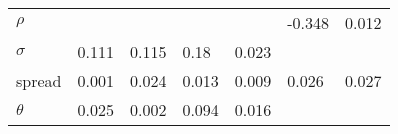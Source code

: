 \begin{table}[H]
\begin{adjustbox}{width=\textwidth}
\begin{tabular}{lllllll}
			$\rho$    &                     &                     &                     &                     &              -0.348 &               0.012 \\
			$\sigma$  &               0.111 &               0.115 &                0.18 &               0.023 &                     &                     \\
			spread &               0.001 &               0.024 &               0.013 &               0.009 &               0.026 &               0.027 \\
			$\theta$  &               0.025 &               0.002 &               0.094 &               0.016 &                     &                     \\
			\bottomrule
		\end{tabular}
		
	\end{adjustbox}
	
\end{table}

